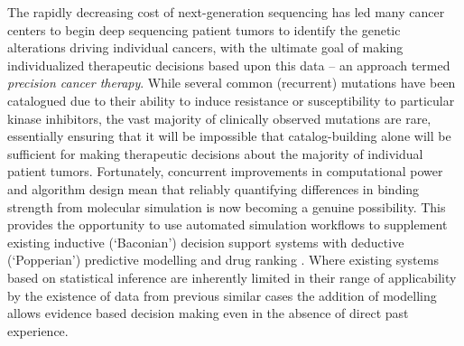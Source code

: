 The rapidly decreasing cost of next-generation sequencing has led many cancer centers to begin deep sequencing patient tumors to identify the genetic alterations driving individual cancers, with the ultimate goal of making individualized therapeutic decisions based upon this data -- an approach termed \textit{precision cancer therapy}.
While several common (recurrent) mutations have been catalogued due to their ability to induce resistance or susceptibility to particular kinase inhibitors, the vast majority of clinically observed mutations are rare, essentially ensuring that it will be impossible that catalog-building alone will be sufficient for making therapeutic decisions about the majority of individual patient tumors.
Fortunately, concurrent improvements in computational power and algorithm design mean that reliably quantifying differences in binding strength from molecular simulation is now becoming a genuine possibility.
This provides the opportunity to use automated simulation workflows to supplement existing inductive (`Baconian') decision support systems with deductive (`Popperian') predictive modelling and drug ranking \cite{Marias2011, Sloot2009}.
Where existing systems based on statistical inference are inherently limited in their range of applicability by the existence of data from previous similar cases the addition of modelling allows evidence based decision making even in the absence of direct past experience.


